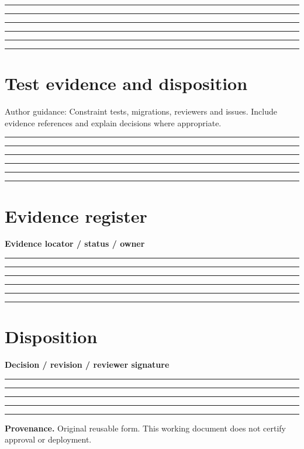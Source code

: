 \documentclass[11pt,letterpaper]{article}
\newcommand{\ResponseLine}{\par\vspace{1.05em}\noindent\rule{\linewidth}{0.4pt}\par}
\newcommand{\ResponseArea}{\ResponseLine\ResponseLine\ResponseLine}
\begin{document}
\ResponseArea\ResponseArea
\section{Test evidence and disposition}
Author guidance: Constraint tests, migrations, reviewers and issues. Include evidence references and explain decisions where appropriate.


\ResponseArea\ResponseArea
\section{Evidence register}
\textbf{Evidence locator / status / owner}\ResponseArea\ResponseArea
\section{Disposition}
\textbf{Decision / revision / reviewer signature}\ResponseArea\ResponseLine
\vfill
\hrule
{\footnotesize\textbf{Provenance.} Original reusable form. This working document does not certify approval or deployment.}
\end{document}
